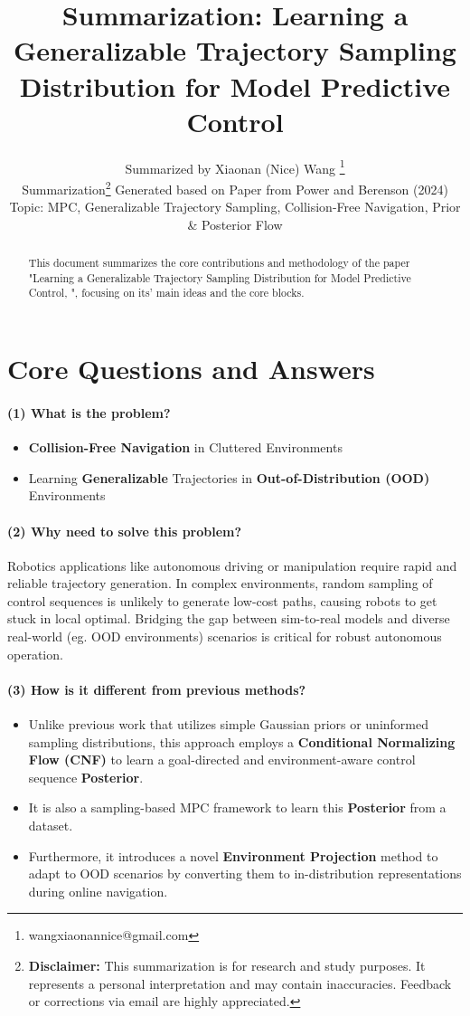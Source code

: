 \documentclass{article}
\title{Summarization: Learning a Generalizable Trajectory Sampling Distribution for Model Predictive Control}
\author{
  Summarized by Xiaonan (Nice) Wang \thanks{wangxiaonannice@gmail.com} \\
  Summarization\thanks{\textbf{Disclaimer:} This summarization is for research and study purposes. It represents a personal interpretation and may contain inaccuracies. Feedback or corrections via email are highly appreciated.} Generated based on Paper from Power and Berenson (2024) \\
  Topic: MPC, Generalizable Trajectory Sampling, Collision-Free Navigation, Prior \& Posterior Flow \\
}
\begin{document}
\maketitle

\begin{abstract}
This document summarizes the core contributions and methodology of the paper "Learning a Generalizable Trajectory Sampling Distribution for Model Predictive Control, \cite{power2024learning}", focusing on its' main ideas and the core blocks.
\end{abstract}

\section{Core Questions and Answers}

\paragraph{(1) What is the problem?} 
\begin{itemize}
  \item \textbf{Collision-Free Navigation} in Cluttered Environments
  \item Learning \textbf{Generalizable} Trajectories in \textbf{Out-of-Distribution (OOD)} Environments
\end{itemize}

\paragraph{(2) Why need to solve this problem?} 
Robotics applications like autonomous driving or manipulation require rapid and reliable trajectory generation. In complex environments, random sampling of control sequences is unlikely to generate low-cost paths, causing robots to get stuck in local optimal. Bridging the gap between sim-to-real models and diverse real-world (eg. OOD environments) scenarios is critical for robust autonomous operation.

\paragraph{(3) How is it different from previous methods?} 
\begin{itemize}
  \item Unlike previous work that utilizes simple Gaussian priors or uninformed sampling distributions, this approach employs a \textbf{Conditional Normalizing Flow (CNF)} to learn a goal-directed and environment-aware control sequence \textbf{Posterior}.
  \item It is also a sampling-based MPC framework to learn this \textbf{Posterior} from a dataset.
  \item Furthermore, it introduces a novel \textbf{Environment Projection} method to adapt to OOD scenarios by converting them to in-distribution representations during online navigation.
\end{itemize}
\end{document}
